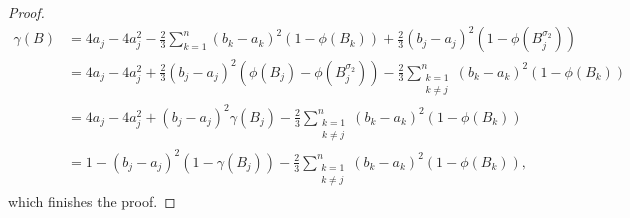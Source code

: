 \documentclass[10pt,a4paper]{amsart}
\begin{document}
\begin{proof}
\begin{align*}
   \gamma(B) &= 4a_j - 4a_j^2 - \tfrac23\sum_{k=1}^n (b_k-a_k)^2(1-\phi(B_k)) + \tfrac23(b_j-a_j)^2(1-\phi(B_j^{\sigma_2})) \\
   &= 4a_j - 4a_j^2 + \tfrac23(b_j-a_j)^2(\phi(B_j)-\phi(B_j^{\sigma_2})) - \tfrac23\sum_{\substack{k=1 \\ k\ne j}}^n (b_k-a_k)^2(1-\phi(B_k))\\
   &= 4a_j - 4a_j^2 + (b_j-a_j)^2\gamma(B_j) - \tfrac23\sum_{\substack{k=1 \\ k\ne j}}^n (b_k-a_k)^2(1-\phi(B_k))\\
   &= 1 - (b_j-a_j)^2(1-\gamma(B_j)) - \tfrac23\sum_{\substack{k=1 \\ k\ne j}}^n (b_k-a_k)^2(1-\phi(B_k)),
\end{align*}
which finishes the proof.
\end{proof}
\end{document}
